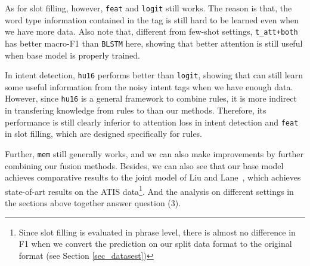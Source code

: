 As for slot filling, however, \texttt{feat} and \texttt{logit} still works.
The reason is that, the word type information contained in the \RE tag is still hard to be learned even when we have more data.
Also note that, different from few-shot settings, \texttt{t\_att+both} has better macro-F1 than \texttt{BLSTM} here, showing that better attention is still useful when base model is properly trained.

In intent detection, \texttt{hu16} performs better than \texttt{logit}, showing that \NN can still learn some useful information from the noisy intent \RE tags when we have enough data.
However, since \texttt{hu16} is a general framework to combine \FOL rules, it is more indirect in transfering knowledge from rules to \NN than our methods. Therefore, its performance is still clearly inferior to attention loss in intent detection and \texttt{feat} in slot filling, which are designed specifically for \RE rules.

Further, \texttt{mem} still generally works, and we can also make improvements by further combining our fusion methods.
Besides, we can also see that our base model achieves comparative results to the joint model of  Liu and Lane~, which achieves state-of-art results on the ATIS data\footnote{
Since slot filling is evaluated in phrase level, there is almost no difference in F1 when we convert the prediction on our split data format to the original format (see Section \ref{sec_datasest})}.
And the analysis on different settings in the sections above together answer question (3).

